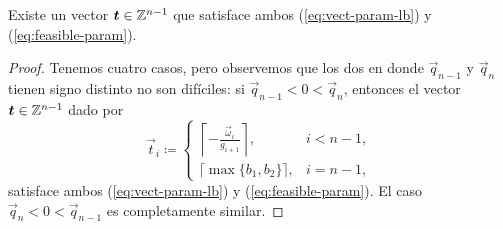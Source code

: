 \begin{lemma}
	\label{lemma:t-existence}
	Existe un vector $\boldsymbol{t} \in \mathbb{Z}^{n-1}$ que satisface ambos (\ref{eq:vect-param-lb}) y
	(\ref{eq:feasible-param}).
\end{lemma}
\begin{proof}
	Tenemos cuatro casos, pero observemos que los dos en donde $\vec{q}_{n - 1}$ y $\vec{q}_n$
	tienen signo distinto no son difíciles: si $\vec{q}_{n - 1} <0 < \vec{q}_n$, entonces el vector
	$\boldsymbol{t} \in \mathbb{Z}^{n-1}$ dado por
	\begin{equation*}
		\vec{t}_i \coloneq \begin{cases}
			\left\lceil -\frac{\vec{\omega}_i}{g_{i + 1}} \right\rceil, & i < n - 1, \\
			\lceil \max\lbrace b_1, b_2 \rbrace \rceil, & i = n - 1,
		\end{cases}
	\end{equation*}
	satisface ambos (\ref{eq:vect-param-lb}) y (\ref{eq:feasible-param}). El caso $\vec{q}_n < 0 <
	\vec{q}_{n - 1}$ es completamente similar.


\end{proof}
